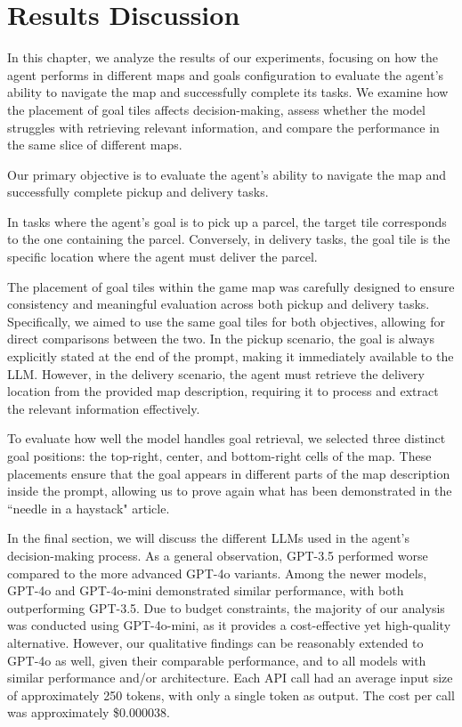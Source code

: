 \chapter{Results Discussion}
\label{cha:results_discussion}

In this chapter, we analyze the results of our experiments, focusing on how the
agent performs in different maps and goals configuration to evaluate the agent's
ability to navigate the map and successfully complete its tasks. We examine how the
placement of goal tiles affects decision-making, assess whether the model
struggles with retrieving relevant information, and compare the performance in the
same slice of different maps.

Our primary objective is to evaluate the agent's ability to navigate the map and
successfully complete pickup and delivery tasks.

In tasks where the agent's goal is to pick up a parcel, the target tile
corresponds to the one containing the parcel. Conversely, in delivery tasks, the
goal tile is the specific location where the agent must deliver the parcel.

The placement of goal tiles within the game map was carefully designed to ensure
consistency and meaningful evaluation across both pickup and delivery tasks.
Specifically, we aimed to use the same goal tiles for both objectives, allowing
for direct comparisons between the two. In the pickup scenario, the goal is
always explicitly stated at the end of the prompt, making it immediately available
to the LLM. However, in the delivery scenario, the agent must retrieve the
delivery location from the provided map description, requiring it to process and
extract the relevant information effectively.

To evaluate how well the model handles goal retrieval, we selected three
distinct goal positions: the top-right, center, and bottom-right cells of the map.
These placements ensure that the goal appears in different parts of the map
description inside the prompt, allowing us to prove again what has been demonstrated
in the ``needle in a haystack" article\cite{needleRAG}.

In the final section, we will discuss the different LLMs used in the agent's
decision-making process. As a general observation, GPT-3.5 performed worse
compared to the more advanced GPT-4o variants. Among the newer models, GPT-4o
and GPT-4o-mini demonstrated similar performance, with both outperforming GPT-3.5.
Due to budget constraints, the majority of our analysis was conducted using GPT-4o-mini,
as it provides a cost-effective yet high-quality alternative. However, our
qualitative findings can be reasonably extended to GPT-4o as well, given their comparable
performance, and to all models with similar performance and/or architecture. Each
API call had an average input size of approximately 250 tokens, with only a
single token as output. The cost per call was approximately \$0.000038.

